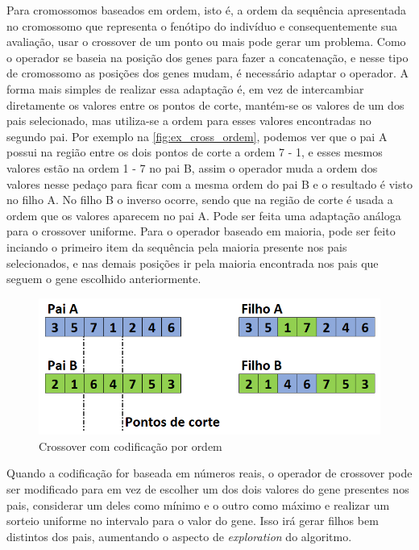 Para cromossomos baseados em ordem, isto é, a ordem da sequência apresentada no cromossomo que representa o fenótipo do indivíduo e consequentemente sua avaliação, usar o crossover de um ponto ou mais pode gerar um problema. Como o operador se baseia na posição dos genes para fazer a concatenação, e nesse tipo de cromossomo as posições dos genes mudam, é necessário adaptar o operador. A forma mais simples de realizar essa adaptação é, em vez de intercambiar diretamente os valores entre os pontos de corte, mantém-se os valores de um dos pais selecionado, mas utiliza-se a ordem para esses valores encontradas no segundo pai. Por exemplo na \autoref{fig:ex_cross_ordem}, podemos ver que o pai A possui na região entre os dois pontos de corte a ordem 7 - 1, e esses mesmos valores estão na ordem 1 - 7 no pai B, assim o operador muda a ordem dos valores nesse pedaço para ficar com a mesma ordem do pai B e o resultado é visto no filho A. No filho B o inverso ocorre, sendo que na região de corte é usada a ordem que os valores aparecem no pai A. Pode ser feita uma adaptação análoga para o crossover uniforme. Para o operador baseado em maioria, pode ser feito inciando o primeiro item da sequência pela maioria presente nos pais selecionados, e nas demais posições ir pela maioria encontrada nos pais que seguem o gene escolhido anteriormente.

\begin{figure}[ht]
	\centering
	\includegraphics[width=0.75\linewidth]{imagens/exemplo_cross_ordem.png}
	\caption{Crossover com codificação por ordem}
	\label{fig:ex_cross_ordem}
\end{figure}

Quando a codificação for baseada em números reais, o operador de crossover pode ser modificado para em vez de escolher um dos dois valores do gene presentes nos pais, considerar um deles como mínimo e o outro como máximo e realizar um sorteio uniforme no intervalo para o valor do gene. Isso irá gerar filhos bem distintos dos pais, aumentando o aspecto de \textit{exploration} do algoritmo.

